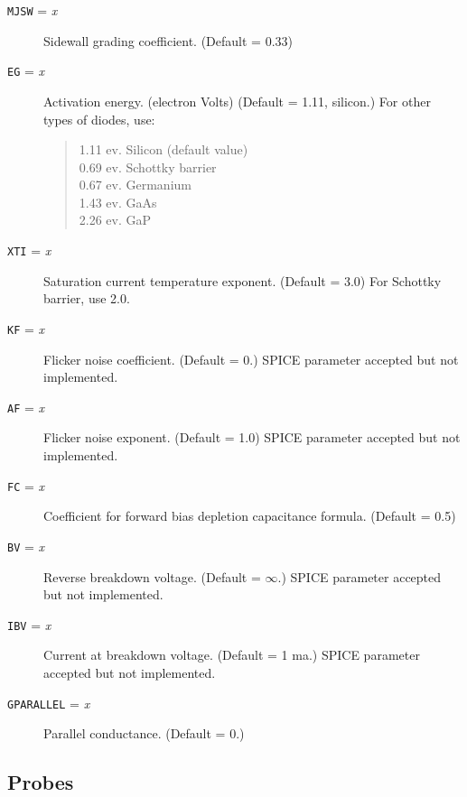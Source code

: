 \begin{description}
\item[{\tt MJSW} = {\it x}] Sidewall grading coefficient.  (Default =
  0.33)
  
\item[{\tt EG} = {\it x}] Activation energy. (electron Volts) (Default
  = 1.11, silicon.)  For other types of diodes, use:
\begin{verse}
1.11 ev.  Silicon (default value)\\
0.69 ev.  Schottky barrier\\
0.67 ev.  Germanium\\
1.43 ev.  GaAs\\
2.26 ev.  GaP
\end{verse}

\item[{\tt XTI} = {\it x}] Saturation current temperature exponent.
  (Default = 3.0) For Schottky barrier, use 2.0.
  
\item[{\tt KF} = {\it x}] Flicker noise coefficient.  (Default = 0.)
  SPICE parameter accepted but not implemented.
  
\item[{\tt AF} = {\it x}] Flicker noise exponent.  (Default = 1.0)
  SPICE parameter accepted but not implemented.
  
\item[{\tt FC} = {\it x}] Coefficient for forward bias depletion
  capacitance formula. (Default = 0.5)
  
\item[{\tt BV} = {\it x}] Reverse breakdown voltage.  (Default =
  $\infty$.)  SPICE parameter accepted but not implemented.
  
\item[{\tt IBV} = {\it x}] Current at breakdown voltage. (Default = 1
  ma.)  SPICE parameter accepted but not implemented.
  
\item[{\tt GPARALLEL} = {\it x}] Parallel conductance. (Default = 0.)

\end{description}
\subsection{Probes}

